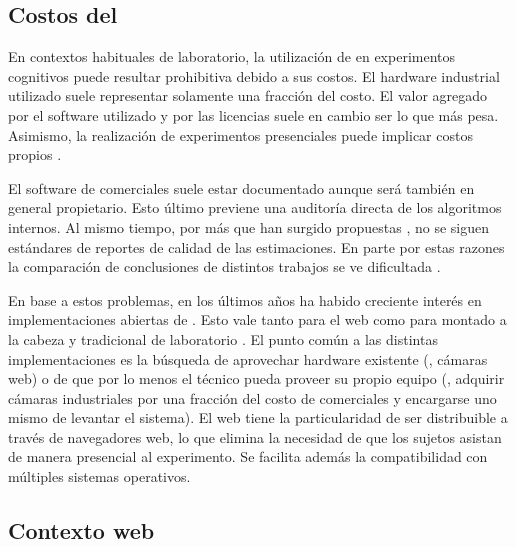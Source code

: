 \subsection{Costos del \eyetracking}

En contextos habituales de laboratorio, la utilización de \eyetracking en
experimentos cognitivos puede resultar prohibitiva debido a sus costos.
El hardware industrial utilizado suele representar solamente una fracción del
costo.
El valor agregado por el software utilizado y por las licencias suele en cambio
ser lo que más pesa.
Asimismo, la realización de experimentos presenciales puede implicar costos
propios \cite{zandi_2021_pupilext, xu_2015_turker_gaze}.

El software de \eyetrackers comerciales suele estar documentado aunque será
también en general propietario.
Esto último previene una auditoría directa de los algoritmos internos.
Al mismo tiempo, por más que han surgido propuestas
\cite{antoniades_2013_standarized_protocol}, no se siguen estándares de
reportes de calidad de las estimaciones.
En parte por estas razones la comparación de conclusiones de distintos trabajos
se ve dificultada \cite{zandi_2021_pupilext,
salvucci_2000_identifying_fixations}.

En base a estos problemas, en los últimos años ha habido creciente interés en
implementaciones abiertas de \eyetrackers.
Esto vale tanto para el \eyetracking web \cite{xu_2015_turker_gaze,
papoutsaki_2016_webgazer} como para \eyetracking montado a la cabeza
\cite{santini_2017_eyerectoo} y \eyetracking tradicional de laboratorio
\cite{zandi_2021_pupilext}.
El punto común a las distintas implementaciones es la búsqueda de aprovechar
hardware existente (\eg, cámaras web) o de que por lo menos el técnico pueda
proveer su propio equipo (\ie, adquirir cámaras industriales por una fracción
del costo de \eyetrackers comerciales y encargarse uno mismo de levantar el
sistema).
El \eyetracking web tiene la particularidad de ser distribuible a través de
navegadores web, lo que elimina la necesidad de que los sujetos asistan
de manera presencial al experimento.
Se facilita además la compatibilidad con múltiples sistemas operativos.

\subsection{Contexto web}

